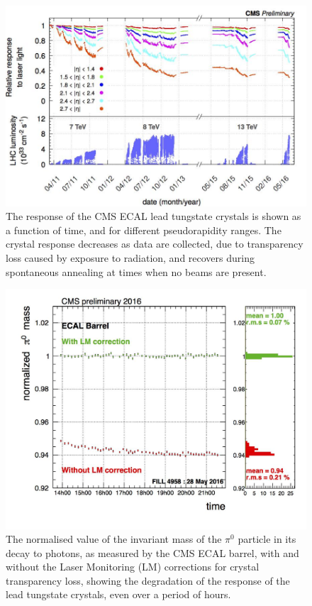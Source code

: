 \begin{figure}[h]
\centering
\includegraphics[width=1.0\textwidth]{detectorFigures/EcalLaserCorrections.jpg}
\caption{The response of the CMS ECAL lead tungstate crystals is shown as a function of time, and for different pseudorapidity ranges. The crystal response decreases as data are collected, due to transparency loss caused by exposure to radiation, and recovers during spontaneous annealing at times when no beams are present. \cite{CMSECALPublic}}
\label{fig:cms:ecal:lasercorrections}
\end{figure}

\begin{figure}[h]
\centering
\includegraphics[width=1.0\textwidth]{detectorFigures/pi0_EB_plus_1.jpg}
\caption{The normalised value of the invariant mass of the $\pi^0$ particle in its decay to photons, as measured by the CMS ECAL barrel, with and without the Laser Monitoring (LM) corrections for crystal transparency loss, showing the degradation of the response of the lead tungstate crystals, even over a period of hours. \cite{CMSECALPublic}}
\label{fig:cms:ecal:pizeroLMcorr}
\end{figure}

